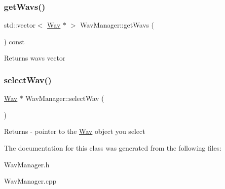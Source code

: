 \subsubsection{\texorpdfstring{get\+Wavs()}{getWavs()}}
{\footnotesize\ttfamily std\+::vector$<$ \hyperlink{classWav}{Wav} $\ast$ $>$ Wav\+Manager\+::get\+Wavs (\begin{DoxyParamCaption}{ }\end{DoxyParamCaption}) const}

\begin{DoxyReturn}{Returns}
wavs vector 
\end{DoxyReturn}
\mbox{\label{classWavManager_a30d87e1568d7fcdcf81089c8125819d1}} 
\subsubsection{\texorpdfstring{select\+Wav()}{selectWav()}}
{\footnotesize\ttfamily \hyperlink{classWav}{Wav} $\ast$ Wav\+Manager\+::select\+Wav (\begin{DoxyParamCaption}{ }\end{DoxyParamCaption})}

\begin{DoxyReturn}{Returns}
-\/ pointer to the \hyperlink{classWav}{Wav} object you select 
\end{DoxyReturn}


The documentation for this class was generated from the following files\+:\begin{DoxyCompactItemize}
\item 
Wav\+Manager.\+h\item 
Wav\+Manager.\+cpp\end{DoxyCompactItemize}
